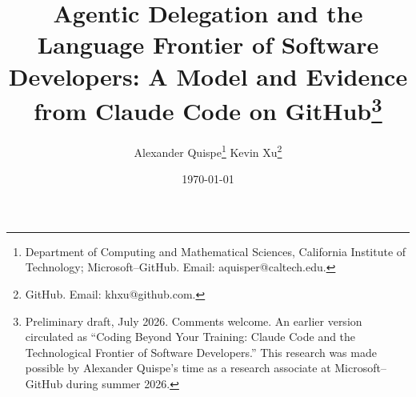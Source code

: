 \documentclass[12pt]{article}
\title{Agentic Delegation and the Language Frontier of Software Developers:
A Model and Evidence from Claude Code on GitHub\thanks{Preliminary draft, July 2026.
Comments welcome. An earlier version circulated as ``Coding Beyond Your
Training: Claude Code and the Technological Frontier of Software
Developers.'' This research was made possible by Alexander Quispe's time
as a research associate at Microsoft--GitHub during summer 2026.}}
\author{Alexander Quispe\thanks{Department of Computing and Mathematical
Sciences, California Institute of Technology; Microsoft--GitHub.
Email: aquisper@caltech.edu.}
\qquad
Kevin Xu\thanks{GitHub. Email: khxu@github.com.}}
\date{\today}
\theoremstyle{remark}
\theoremstyle{plain}
\newcommand{\1}[1]{\mathds{1}\left[#1\right]}
\begin{document}
\maketitle
\thispagestyle{empty}



\newpage
\setcounter{page}{1}













\clearpage
\small


\clearpage
\normalsize
\begin{appendices}

\end{appendices}
\end{document}
